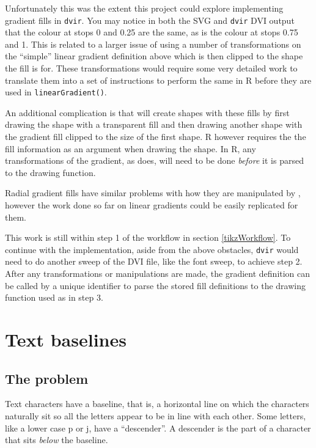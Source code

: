 \documentclass[]{article}
\begin{document}
Unfortunately this was the extent this project could explore
implementing \Tikz{} gradient fills in \texttt{dvir}. You may notice in
both the SVG and \texttt{dvir} DVI output that the colour at stops 0 and
0.25 are the same, as is the colour at stops 0.75 and 1. This is related
to a larger issue of \Tikz{} using a number of transformations on the
``simple'' linear gradient definition above which is then clipped to the
shape the fill is for. These transformations would require some very
detailed work to translate them into a set of instructions to perform
the same in R before they are used in \texttt{linearGradient()}.

An additional complication is that \Tikz{} will create shapes with these
fills by first drawing the shape with a transparent fill and then
drawing another shape with the gradient fill clipped to the size of the
first shape. R however requires the the fill information as an argument
when drawing the shape. In R, any transformations of the gradient, as
\Tikz{} does, will need to be done \emph{before} it is parsed to the
drawing function.

Radial gradient fills have similar problems with how they are
manipulated by \Tikz{}, however the work done so far on linear gradients
could be easily replicated for them.

This work is still within step 1 of the workflow in section
\ref{tikzWorkflow}. To continue with the implementation, aside from the
above obstacles, \texttt{dvir} would need to do another sweep of the DVI
file, like the font sweep, to achieve step 2. After any transformations
or manipulations are made, the gradient definition can be called by a
unique identifier to parse the stored fill definitions to the drawing
function used as in step 3.

\newpage{}

\section{Text baselines}\label{text-baselines}

\subsection{The problem}\label{the-problem}

Text characters have a baseline, that is, a horizontal line on which the
characters naturally sit so all the letters appear to be in line with
each other. Some letters, like a lower case p or j, have a
``descender''. A descender is the part of a character that sits
\emph{below} the baseline.
\end{document}
